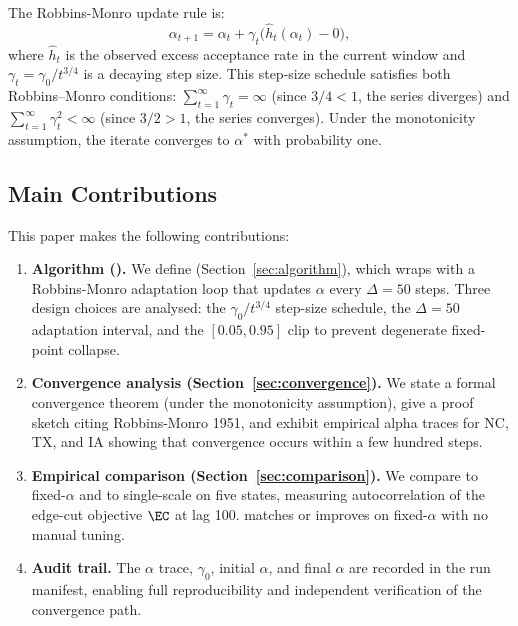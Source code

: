 The Robbins-Monro update rule is:
\[
  \alpha_{t+1} = \alpha_t + \gamma_t \bigl(\hat{h}_t(\alpha_t) - 0\bigr),
\]
where $\hat{h}_t$ is the observed excess acceptance rate in the current window
and $\gamma_t = \gamma_0 / t^{3/4}$ is a decaying step size.
This step-size schedule satisfies both Robbins--Monro conditions:
$\sum_{t=1}^\infty \gamma_t = \infty$ (since $3/4 < 1$, the series diverges) and
$\sum_{t=1}^\infty \gamma_t^2 < \infty$ (since $3/2 > 1$, the series converges).
Under the monotonicity assumption, the iterate converges to $\alpha^*$
with probability one.

\subsection{Main Contributions}

This paper makes the following contributions:

\begin{enumerate}
  \item \textbf{Algorithm (\ams{}).}
    We define \ams{} (Section~\ref{sec:algorithm}), which wraps \ms{} with
    a Robbins-Monro adaptation loop that updates $\alpha$ every
    $\Delta = 50$ steps.
    Three design choices are analysed: the $\gamma_0/t^{3/4}$ step-size
    schedule, the $\Delta = 50$ adaptation interval, and the $[0.05, 0.95]$
    clip to prevent degenerate fixed-point collapse.

  \item \textbf{Convergence analysis (Section~\ref{sec:convergence}).}
    We state a formal convergence theorem (under the monotonicity assumption),
    give a proof sketch citing Robbins-Monro 1951, and exhibit empirical
    alpha traces for NC, TX, and IA showing that convergence occurs within a
    few hundred steps.

  \item \textbf{Empirical comparison (Section~\ref{sec:comparison}).}
    We compare \ams{} to fixed-$\alpha$ \ms{} and to single-scale \recom{}
    on five states, measuring autocorrelation of the edge-cut objective
    $\EC$ at lag 100.
    \ams{} matches or improves on fixed-$\alpha$ \ms{} with no manual tuning.

  \item \textbf{Audit trail.}
    The $\alpha$ trace, $\gamma_0$, initial $\alpha$, and final $\alpha$ are
    recorded in the run manifest, enabling full reproducibility and independent
    verification of the convergence path.
\end{enumerate}

